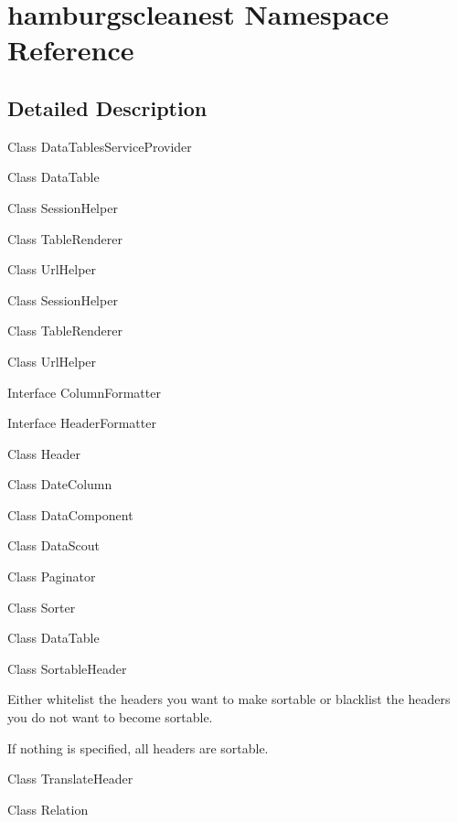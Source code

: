\hypertarget{namespacehamburgscleanest}{}\section{hamburgscleanest Namespace Reference}
\label{namespacehamburgscleanest}


\subsection{Detailed Description}
Class Data\+Tables\+Service\+Provider 

Class Data\+Table 

Class Session\+Helper 

Class Table\+Renderer 

Class Url\+Helper 

Class Session\+Helper 

Class Table\+Renderer 

Class Url\+Helper 

Interface Column\+Formatter 

Interface Header\+Formatter 

Class Header 

Class Date\+Column 

Class Data\+Component 

Class Data\+Scout 

Class Paginator 

Class Sorter 

Class Data\+Table 

Class Sortable\+Header

Either whitelist the headers you want to make sortable or blacklist the headers you do not want to become sortable.

If nothing is specified, all headers are sortable.

Class Translate\+Header

Class Relation  
